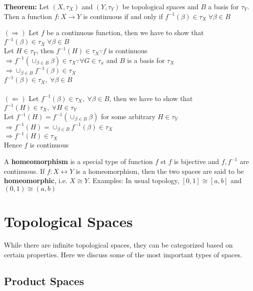 \documentclass{article}
\begin{document}
\textbf{Theorem:} Let $(X, \tau_X)$ and $(Y, \tau_Y)$ be topological spaces and $B$ a basis for $\tau_Y$. Then a function $f: X \rightarrow Y$ is continuous if and only if $f^{-1}(\beta) \in \tau_X \; \forall \beta \in B$
\begin{tcolorbox}[colback=lightgray!10,colframe=lightgray!10, fontupper=\linespread{1.5}\selectfont]
	$(\Rightarrow)$ Let $f$ be a continuous function, then we have to show that $f^{-1}(\beta) \in \tau_X \; \forall \beta \in B$ \\
	Let $H \in \tau_Y$, then $f^{-1}(H) \in \tau_X \because f$ is continuous \\
	$\Rightarrow f^{-1}(\cup_{\beta \in B} \beta) \in \tau_X \because \forall G \in \tau_x$ and $B$ is a basis for $\tau_X$ \\
	$\Rightarrow \cup_{\beta \in B} f^{-1} (\beta) \in \tau_X$ \\
	$f^{-1}(\beta) \in \tau_X, \; \forall \beta \in B$ \\\\
	$(\Leftarrow)$ Let $f^{-1}(\beta) \in \tau_X, \; \forall \beta \in B$, then we have to show that $f^{-1} (H) \in \tau_X, \; \forall H \in \tau_Y$ \\	
	Let $f^{-1}(H) = f^{-1}(\cup_{\beta \in B} \beta)$ for some arbitrary $H \in \tau_Y$ \\
	$\Rightarrow f^{-1}(H) = \cup_{\beta \in B} f^{-1} (\beta) \in \tau_X$ \\	
	$\Rightarrow f^{-1}(H) \in \tau_X$ \\	
	Hence $f$ is continuous
\end{tcolorbox}

A \textbf{homeomorphism} is a special type of function $f$ st $f$ is bijective and $f, f^{-1}$ are continuous. If $f: X \leftrightarrow Y$ is a homeomorphism, then the two spaces are said to be \textbf{homeomorphic}, i.e. $X \cong Y$. Examples: In usual topology, $[0,1] \cong [a,b]$ and $(0,1) \cong (a,b)$

\section{Topological Spaces}

While there are infinite topological spaces, they can be categorized based on certain properties. Here we discuss some of the most important types of spaces.

\subsection{Product Spaces}
\end{document}
